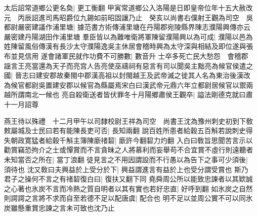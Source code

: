 太后詔常道鄉公更名奐|{
	更工衡翻}
甲寅常道鄉公入洛陽是日即皇帝位年十五大赦改元　丙辰詔進司馬昭爵位九錫如前昭固讓乃止　癸亥以尚書右僕射王觀為司空　吳都尉嚴密建議作浦里塘|{
	據范書方術傳浦里塘在丹陽郡宛陵縣界陳志濮陽興傳亦云嚴密建丹陽湖田作浦里塘}
羣臣皆以為難唯衛將軍陳留濮陽興以為可成|{
	濮陽以邑為姓陳留風俗傳漢有長沙太守濮陽逸吳主休居會稽時興為太守深與相結及即位遂與張布並見信用}
遂會諸軍民就作功費不可勝數|{
	數音升}
士卒多死亡民大愁怨　會稽郡謡言王亮當還為天子而亮宫人告亮使巫禱祠有惡言有司以聞吳主黜亮為候官侯遣之國|{
	晉志曰建安郡故秦閩中郡漢高祖以封閩越王及武帝滅之徙其人名為東治後漢改為候官都尉吳置建安郡以候官為縣屬焉宋白曰漢武帝元鼎六年立都尉居候官以禦兩越所謂南北一候也}
亮自殺衛送者皆伏罪冬十月陽鄉肅侯王觀卒|{
	謚法剛德克就曰肅}
十一月詔尊

燕王待以殊禮　十二月甲午以司隸校尉王祥為司空　尚書王沈為豫州刺史初到下敎敕屬城及士民曰若有能陳長吏可否|{
	長知兩翻}
說百姓所患者給穀五百斛若說刺史得失朝政寛猛者給穀千斛主簿陳廞禇䂮|{
	廞許今翻䂮力灼翻}
入白曰敎旨思聞苦言示以勸賞竊恐拘介之士或憚賞而不言貪昧之人將慕利而妄舉苟不合宜賞不虛行則遠聽者未知當否之所在|{
	當丁浪翻}
徒見言之不用因謂設而不行愚以為告下之事可少須後|{
	須待也}
沈又敎曰夫興益於上受分於下|{
	興益謂進言有益於上也受分謂受賞也}
斯乃君子之操何不言之有禇䂮復白曰|{
	復扶又翻下同}
堯舜周公所以能致忠諫者以其欵誠之心著也氷炭不言而冷熱之質自明者以其有實也若好忠直|{
	好呼到翻}
如氷炭之自然則諤諤之言將不求而自至若德不足以配唐虞|{
	配合也}
明不足以並周公實不可以同氷炭雖懸重賞忠諫之言未可致也沈乃止

